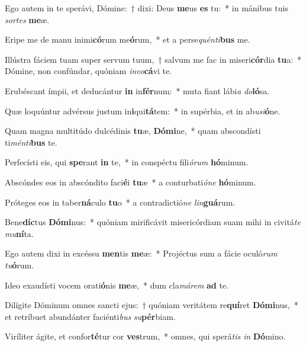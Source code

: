 \item Ego autem in te sperávi, Dómine:~† dixi: Deus \textbf{me}us \textbf{es} tu:~* in mánibus tuis \textit{sor}\textit{tes} \textbf{me}æ.
\item Eripe me de manu inimi\textbf{có}rum me\textbf{ó}rum,~* et a perse\textit{quén}\textit{ti}\textbf{bus} me.
\item Illústra fáciem tuam super servum tuum,~† salvum me fac in miseri\textbf{cór}dia \textbf{tu}a:~* Dómine, non confúndar, quóniam \textit{in}\textit{vo}\textbf{cá}vi te.
\item Erubéscant ímpii, et deducántur \textbf{in} in\textbf{fér}num:~* muta fiant lábi\textit{a} \textit{do}\textbf{ló}sa.
\item Quæ loquúntur advérsus justum in\textbf{i}qui\textbf{tá}tem:~* in supérbia, et in ab\textit{u}\textit{si}\textbf{ó}ne.
\item Quam magna multitúdo dulcédinis \textbf{tu}æ, \textbf{Dó}\textbf{mi}ne,~* quam abscondísti ti\textit{mén}\textit{ti}\textbf{bus} te.
\item Perfecísti eis, qui \textbf{spe}rant \textbf{in} te,~* in conspéctu fili\textit{ó}\textit{rum} \textbf{hó}minum.
\item Abscóndes eos in abscóndito faci\textbf{é}i \textbf{tu}æ~* a conturbati\textit{ó}\textit{ne} \textbf{hó}minum.
\item Próteges eos in taber\textbf{ná}culo \textbf{tu}o~* a contradictió\textit{ne} \textit{lin}\textbf{guá}rum.
\item Bene\textbf{díc}tus \textbf{Dó}\textbf{mi}nus:~* quóniam mirificávit misericórdiam suam mihi in civitá\textit{te} \textit{mu}\textbf{ní}ta.
\item Ego autem dixi in excéssu \textbf{men}tis \textbf{me}æ:~* Projéctus sum a fácie oculó\textit{rum} \textit{tu}\textbf{ó}rum.
\item Ideo exaudísti vocem orati\textbf{ó}nis \textbf{me}æ,~* dum cla\textit{má}\textit{rem} \textbf{ad} te.
\item Dilígite Dóminum omnes sancti ejus:~† quóniam veritátem re\textbf{quí}ret \textbf{Dó}\textbf{mi}nus,~* et retríbuet abundánter faciénti\textit{bus} \textit{su}\textbf{pér}biam.
\item Viríliter ágite, et confor\textbf{té}tur cor \textbf{ves}trum,~* omnes, qui sperá\textit{tis} \textit{in} \textbf{Dó}mino.
